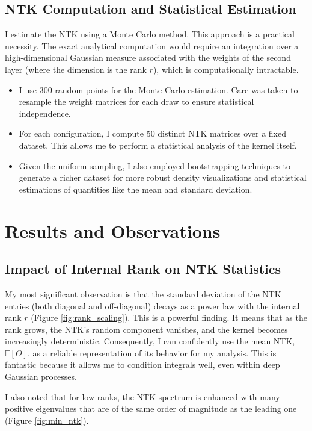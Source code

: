 \documentclass[a4paper]{article}
\begin{document}
\subsection{NTK Computation and Statistical Estimation}
I estimate the NTK using a Monte Carlo method. This approach is a practical necessity. The exact analytical computation would require an integration over a high-dimensional Gaussian measure associated with the weights of the second layer (where the dimension is the rank $r$), which is computationally intractable.
\begin{itemize}
    \item I use 300 random points for the Monte Carlo estimation. Care was taken to resample the weight matrices for each draw to ensure statistical independence.
    \item For each configuration, I compute 50 distinct NTK matrices over a fixed dataset. This allows me to perform a statistical analysis of the kernel itself.
    \item Given the uniform sampling, I also employed bootstrapping techniques to generate a richer dataset for more robust density visualizations and statistical estimations of quantities like the mean and standard deviation.
\end{itemize}

\section{Results and Observations}

\subsection{Impact of Internal Rank on NTK Statistics}
My most significant observation is that the standard deviation of the NTK entries (both diagonal and off-diagonal) decays as a power law with the internal rank $r$ (Figure \ref{fig:rank_scaling}). This is a powerful finding. It means that as the rank grows, the NTK's random component vanishes, and the kernel becomes increasingly deterministic. Consequently, I can confidently use the mean NTK, $\mathbb{E}[\Theta]$, as a reliable representation of its behavior for my analysis. This is fantastic because it allows me to condition integrals well, even within deep Gaussian processes.

I also noted that for low ranks, the NTK spectrum is enhanced with many positive eigenvalues that are of the same order of magnitude as the leading one (Figure \ref{fig:min_ntk}).
\end{document}
